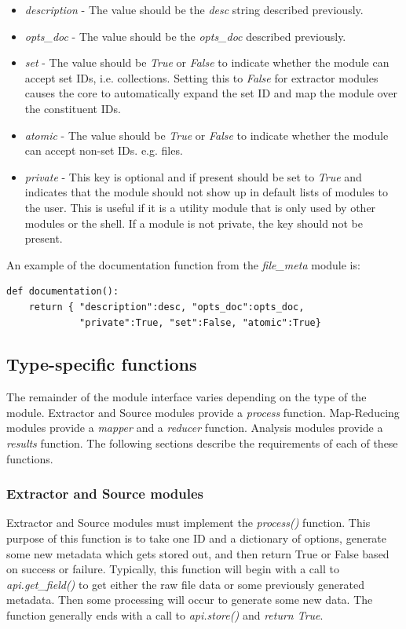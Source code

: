 \documentclass{book}
\begin{document}
\begin{itemize} \item \emph{description} - The value should be the \emph{desc} string described previously.
\item \emph{opts\_doc} - The value should be the \emph{opts\_doc}  described previously.
\item \emph{set} - The value should be \emph{True} or \emph{False} to indicate whether the module can accept set IDs, i.e. collections.  Setting this to \emph{False} for extractor modules causes the core to automatically expand the set ID and map the module over the constituent IDs.
\item \emph{atomic} - The value should be \emph{True} or \emph{False} to indicate whether the module can accept non-set IDs. e.g. files.
\item \emph{private} - This key is optional and if present should be set to \emph{True} and indicates that the module should not show up in default lists of modules to the user.  This is useful if it is a utility module that is only used by other modules or the shell.  If a module is not private, the key should not be present.
\end{itemize}
An example of the documentation function from the \emph{file\_meta} module is:
\begin{verbatim}
def documentation():
    return { "description":desc, "opts_doc":opts_doc, 
             "private":True, "set":False, "atomic":True}
\end{verbatim}

\subsection{Type-specific functions}
The remainder of the module interface varies depending on the type of the module.  Extractor and Source modules provide a \emph{process} function.  Map-Reducing modules provide a \emph{mapper} and a \emph{reducer} function.  Analysis modules provide a \emph{results} function.  The following sections describe the requirements of each of these functions.

\subsubsection{Extractor and Source modules}
Extractor and Source modules must implement the \emph{process()} function.  This purpose of this function is to take one ID and a dictionary of options, generate some new metadata which gets stored out, and then return True or False based on success or failure.  Typically, this function will begin with a call to \emph{api.get\_field()} to get either the raw file data or some previously generated metadata.  Then some processing will occur to generate some new data.  The function generally ends with a call to \emph{api.store()} and \emph{return True}.  
\end{document}
